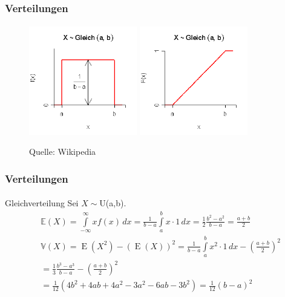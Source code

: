 \documentclass{beamer}
\begin{document}
\begin{frame}
    \frametitle{Verteilungen}
\framesubtitle{}

\begin{figure}[htp]
      \centering
    \includegraphics[width=0.42\textwidth]{img/gleichverteilung1}
    \includegraphics[width=0.42\textwidth]{img/gleichverteilung2}
      \caption{Quelle: Wikipedia}
\end{figure}
 \end{frame}




\begin{frame}
    \frametitle{Verteilungen}
\framesubtitle{}

\begin{block}{Gleichverteilung}
Sei $X \sim $U(a,b).
\begin{align*}
& \mathbb{E}(X) =\int\limits_{-\infty}^\infty xf(x)\,dx = \frac 1{b-a}\int\limits_a^b x\cdot 1\,dx = \frac 12\frac{b^2-a^2}{b-a} = \frac{a+b}2 \\
& \mathbb{V}(X) = \operatorname{E}(X^2) - \left({\operatorname{E}(X)} \right)^2  = \frac{1}{b - a}\int\limits_a^b {x^2 \cdot 1\,dx}  - \left( {\frac{a + b}{2}} \right)^2  \\
 & = \frac{1}{3}\frac{b^3  - a^3}{b - a} - \left( {\frac{a + b}{2}} \right)^2 \\
    &= \frac{1}{12}\left( {4b^2  + 4ab + 4a^2  - 3a^2  - 6ab - 3b^2 } \right) = \frac{1}{12}(b - a)^2
\end{align*}
\end{block}
 \end{frame}
\end{document}
